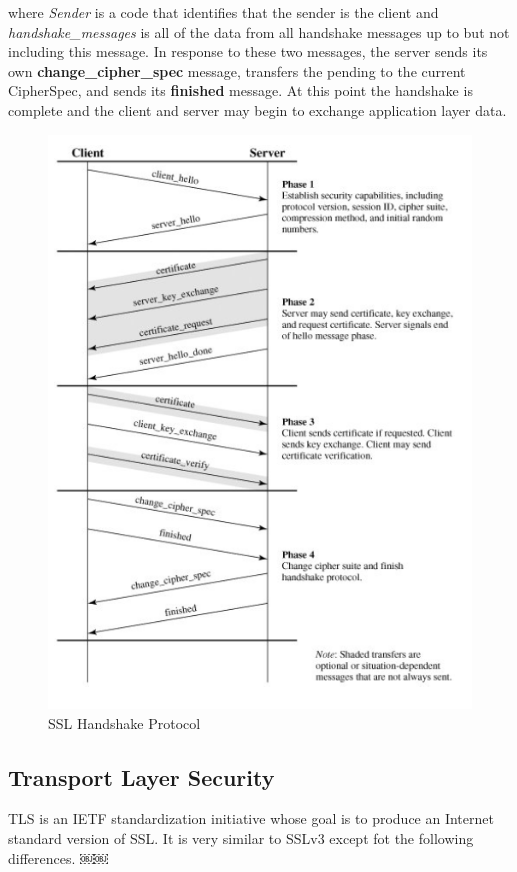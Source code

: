 \documentclass[12pt]{article}
\begin{document}
\begin{description}
where \textit{Sender} is a code that identifies that the sender is the client and \textit{handshake\_messages} is all of the data from all handshake messages up to but not including this message.
In response to these two messages, the server sends its own \textbf{change\_cipher\_spec} message, transfers the pending to the current CipherSpec, and sends its \textbf{finished} message. At this point the handshake is complete and the client and server may begin to exchange application layer data.
\begin{figure}[h!]
  \centering
  \includegraphics[scale = 0.8]{SSL-Handshake.png}
  \caption{SSL Handshake Protocol}
 \end{figure}
\end{description}
\subsection{Transport Layer Security}
TLS is an IETF standardization initiative whose goal is to produce an Internet standard version of SSL. It is very similar to SSLv3 except fot the following differences.
￼￼
\end{document}
